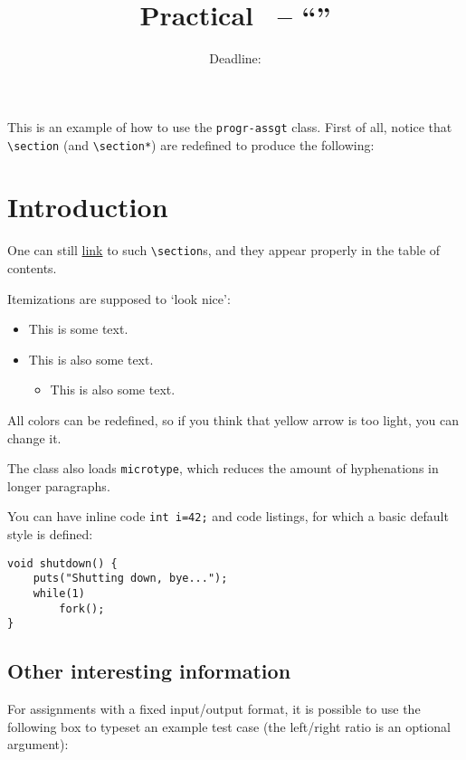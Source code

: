 \documentclass{progr-assgt}
\title{\courseName\\Practical \practicalNumber\ -- ``\practicalName''}
\subtitle{Deadline: \deadline}
\begin{document}
\maketitle

This is an example of how to use the \verb!progr-assgt! class. First of all, notice that \verb!\section! (and \verb!\section*!) are redefined to produce the following:

\section{Introduction}\label{sec:intro}

One can still \hyperref[sec:intro]{link} to such \verb!\section!s, and they appear properly in the table of contents.

Itemizations are supposed to `look nice':
\begin{itemize}
    \item This is some text.
    \item This is also some text.
        \begin{itemize}
            \item This is also some text.
        \end{itemize}
\end{itemize}

All colors can be redefined, so if you think that yellow arrow is too light, you can change it.

The class also loads \verb!microtype!, which reduces the amount of hyphenations in longer paragraphs.

You can have inline code \lstinline[style=cstyle]{int i=42;} and code listings, for which a basic default style is defined:

\begin{lstlisting}[style=cstyle]
void shutdown() {
    puts("Shutting down, bye...");
    while(1)
        fork();
}
\end{lstlisting}

\subsection{Other interesting information}
For assignments with a fixed input/output format, it is possible to use the following box to typeset an example test case (the left/right ratio is an optional argument):
\end{document}
